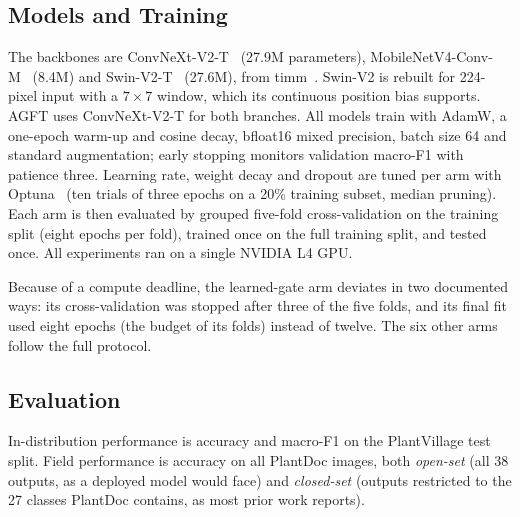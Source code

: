\documentclass[conference]{IEEEtran}
\begin{document}
\subsection{Models and Training}
The backbones are ConvNeXt-V2-T~\cite{woo2023convnextv2} (27.9M parameters), MobileNetV4-Conv-M~\cite{qin2024mobilenetv4} (8.4M) and Swin-V2-T~\cite{liu2022swinv2} (27.6M), from timm~\cite{wightman2019timm}. Swin-V2 is rebuilt for 224-pixel input with a $7{\times}7$ window, which its continuous position bias supports. AGFT uses ConvNeXt-V2-T for both branches. All models train with AdamW, a one-epoch warm-up and cosine decay, bfloat16 mixed precision, batch size 64 and standard augmentation; early stopping monitors validation macro-F1 with patience three. Learning rate, weight decay and dropout are tuned per arm with Optuna~\cite{akiba2019optuna} (ten trials of three epochs on a 20\% training subset, median pruning). Each arm is then evaluated by grouped five-fold cross-validation on the training split (eight epochs per fold), trained once on the full training split, and tested once. All experiments ran on a single NVIDIA L4 GPU.

Because of a compute deadline, the learned-gate arm deviates in two documented ways: its cross-validation was stopped after three of the five folds, and its final fit used eight epochs (the budget of its folds) instead of twelve. The six other arms follow the full protocol.

\subsection{Evaluation}
In-distribution performance is accuracy and macro-F1 on the PlantVillage test split. Field performance is accuracy on all PlantDoc images, both \emph{open-set} (all 38 outputs, as a deployed model would face) and \emph{closed-set} (outputs restricted to the 27 classes PlantDoc contains, as most prior work reports).
\end{document}
